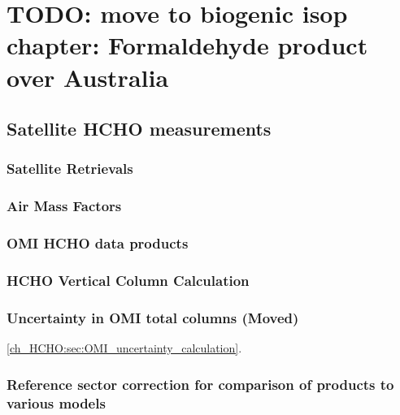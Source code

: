 
\chapter{TODO: move to biogenic isop chapter: Formaldehyde product over Australia} %
\label{ch_HCHO} %

\section{Satellite HCHO measurements}
\label{ch_HCHO:sec:satelliteHCHO}
  \subsection{Satellite Retrievals}
  
  \subsection{Air Mass Factors}
    \label{ch_HCHO:sec:satelliteHCHO:AMFs}
    
  
  \subsection{OMI HCHO data products}
    
  
  \subsection{HCHO Vertical Column Calculation}
    \label{ch_HCHO:sec:satelliteHCHO:CalculationOfVC}

    
  \subsection{Uncertainty in OMI total columns (Moved)}
  \label{ch_HCHO:sec:OMIuncertainty}
    \ref{ch_HCHO:sec:OMI_uncertainty_calculation}.
    
  \subsection{Reference sector correction for comparison of products to various models}
    
